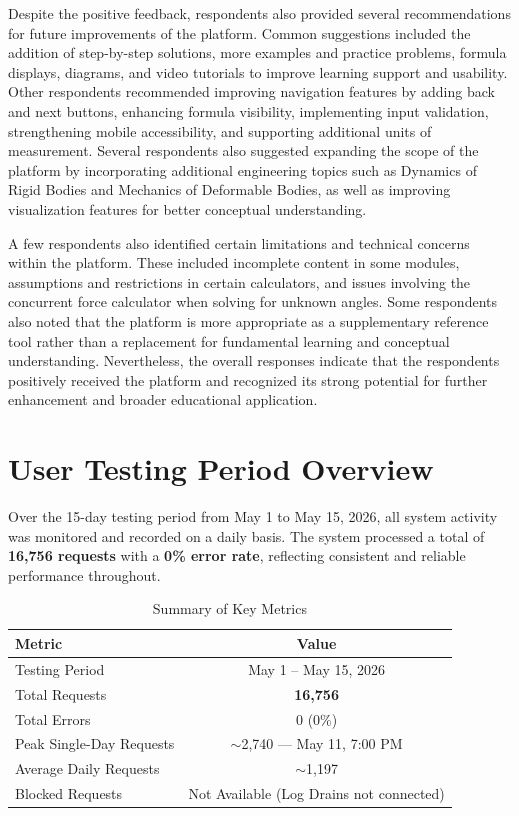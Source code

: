 Despite the positive feedback, respondents also provided several recommendations for future improvements of the platform. Common suggestions included the addition of step-by-step solutions, more examples and practice problems, formula displays, diagrams, and video tutorials to improve learning support and usability. Other respondents recommended improving navigation features by adding back and next buttons, enhancing formula visibility, implementing input validation, strengthening mobile accessibility, and supporting additional units of measurement. Several respondents also suggested expanding the scope of the platform by incorporating additional engineering topics such as Dynamics of Rigid Bodies and Mechanics of Deformable Bodies, as well as improving visualization features for better conceptual understanding.

A few respondents also identified certain limitations and technical concerns within the platform. These included incomplete content in some modules, assumptions and restrictions in certain calculators, and issues involving the concurrent force calculator when solving for unknown angles. Some respondents also noted that the platform is more appropriate as a supplementary reference tool rather than a replacement for fundamental learning and conceptual understanding. Nevertheless, the overall responses indicate that the respondents positively received the platform and recognized its strong potential for further enhancement and broader educational application.

\section{User Testing Period Overview}

Over the 15-day testing period from May 1 to May 15, 2026, all system
activity was monitored and recorded on a daily basis. The system
processed a total of \textbf{16,756 requests} with a \textbf{0\% error
rate}, reflecting consistent and reliable performance throughout.

\vspace{1em}

\begin{table}[H]
\centering
\caption{Summary of Key Metrics}
\small
\renewcommand{\arraystretch}{1.3}

\begin{tabular}{lc}
\hline
\textbf{Metric} & \textbf{Value}\\
\hline
Testing Period & May 1 -- May 15, 2026\\
Total Requests & \textbf{16,756}\\
Total Errors & 0 (0\%)\\
Peak Single-Day Requests & $\sim$2,740 --- May 11, 7:00 PM\\
Average Daily Requests & $\sim$1,197\\
Blocked Requests & Not Available (Log Drains not connected)\\
\hline
\end{tabular}
\end{table}


